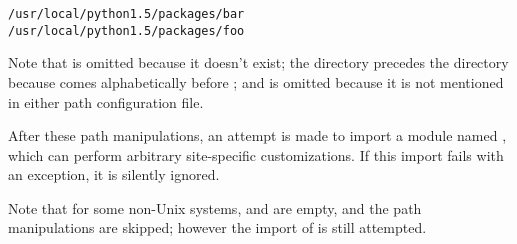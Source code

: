 \bcode\begin{verbatim}
/usr/local/python1.5/packages/bar
/usr/local/python1.5/packages/foo
\end{verbatim}\ecode

Note that  is omitted because it doesn't exist; the
 directory precedes the  directory because
 comes alphabetically before ; and
 is omitted because it is not mentioned in either path
configuration file.

After these path manipulations, an attempt is made to import a module
named , which can perform arbitrary site-specific
customizations.  If this import fails with an 
exception, it is silently ignored.

Note that for some non-Unix systems,  and
 are empty, and the path manipulations are
skipped; however the import of  is still attempted.
